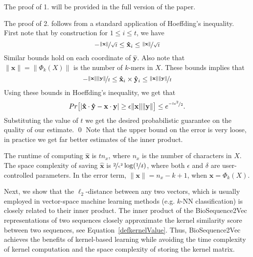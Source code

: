 \documentclass[runningheads]{llncs}
\newcommand{\vect}[1]{\mathbf{#1}}
\begin{document}
The proof of 1. will be provided in the full version of the paper.



The proof of 2. follows from a standard application of Hoeffding's inequality. First note that by construction for $1\leq i \leq t$, we have $$-\nicefrac{\|\vect{x}\|}{\sqrt{t}} \leq \vect{\hat{x}}_i \leq  \nicefrac{\|\vect{x}\|}{\sqrt{t}} $$ Similar bounds hold on each coordinate of $\vect{\hat{y}}$. Also note that $\|\vect{x}\| = \| \Phi_k(X) \|$ is the number of $k$-mers in $X$. These bounds implies that $$-\nicefrac{\|\vect{x}\|\|\vect{y}\|}{{t}} \leq \vect{\hat{x}}_i\times \vect{\hat{y}}_i  \leq  \nicefrac{\|\vect{x}\|\|\vect{y}\|}{{t}} $$  
Using these bounds in Hoeffding's inequality, we get that $$Pr\big[ \vert \vect{\hat{x}} \cdot \vect{\hat{y}} -  \vect{x}\cdot \vect{y} \vert \geq \epsilon \|\vect{x}\| \|\vect{y} \| \big] \leq  e^{\nicefrac{- t \epsilon^2}{2}}. $$ Substituting the value of $t$ we get the desired probabilistic guarantee on the quality of our estimate. \qed
Note that the upper bound on the error is very loose, in practice we get far better estimates of the inner product.

\begin{remark}
The runtime of computing $\vect{\hat{x}}$ is $tn_x$, where $n_x$ is the number of characters in $X$. The space complexity of saving $\vect{\hat{x}}$ is $\nicefrac{2}{\epsilon^2}\log(\nicefrac{1}{\delta})$, where both $\epsilon$ and $\delta$ are user-controlled parameters. In the error term, $\|\vect{x}\| = n_x -k+1$, when $\vect{x}  = \Phi_k(X)$.
\end{remark}





Next, we show that the $\ell_2$-distance between any two
vectors, which is usually employed in vector-space machine learning
methods (e.g. $k$-NN classification) is
closely related to their inner product. The inner product of the
BioSequence2Vec representations of two sequences closely approximate the kernel similarity score between two sequences, see Equation~\eqref{defkernelValue}. Thus, BioSequence2Vec achieves the benefits of
kernel-based learning while avoiding the time complexity of kernel
computation and the space complexity of storing the kernel matrix.
\end{document}
